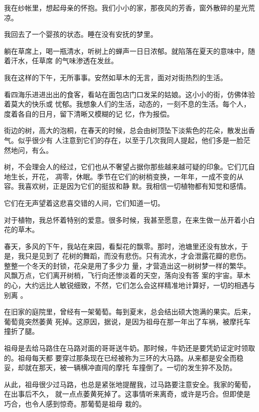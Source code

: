 \documentclass[12pt,a4paper]{article}
\begin{document}
		我在纱帐里，想起母亲的怀抱。我们小小的家，那夜风的芳香，窗外散碎的星光荒凉。

		我回去了一个婴孩的状态。睡在没有安抚的梦里。

	\endwriting



		躺在草席上，喝一瓶清水，听树上的蝉声一日日浓郁。就陷落在夏天的意味中，随着汗水，任草席
	的气味渗透在发丝。


		我在这样的下午，无所事事。安然如草木的无言，面对对街热烈的生活。

		看四海乐进进出出的食客，看站在面包店门口发呆的姑娘。这小小的街，仿佛体验着莫大的快乐或
	忧郁。我想象人们的生活，动态的，一刻不息的生活。每个人，度着各自的日月，留下清晰又模糊的记
	忆，作为报偿。

		街边的树，高大的泡桐，在春天的时候，总会由树顶坠下淡紫色的花朵，散发出香气。似乎很少有
	人注意到它们的存在，以至于几次我同人提起，他们多是一脸茫然地问，有么。


		树，不会理会人的经过，它们也从不奢望占据你那些越来越可疑的印象。它们兀自地生长，开花，
	凋零，休眠。季节在它们的树梢变换，一年年，一成不变的从容。我喜欢树，正是因为它们的挺拔和静
	默。我相信一切植物都有知觉和感情。

		它们在无声望着这悲喜交错的人间，它们知道一切。


		对于植物，我总怀着特别的爱意。很多时候，我甚至愿意，在来生做一丛开着小白花的草木。


		春天，多风的下午，我站在来园，看梨花的飘零。那时，池塘里还没有放水，于是，我只是见到了
	花树的舞蹈，而没有悲伤。只有流水，才会泄露花瓣的悲伤。整整一个冬天的封锁，花朵是用了多少力
	量，才营造出这一树树梦一样的繁华。风飘万点，它们离开树梢，飞行向还惨淡着的天空，落向没有答
	案的宇宙。草木的心，大约远比人敏锐细致，不然，它们怎么会这样精准地计算好，一切的相遇与别离
	。


		在旧家的庭院里，曾经有一架葡萄。每到夏末，总会结出硕大饱满的果实。后来，葡萄竟突然萎黄
	死掉。这原因，据说，是因为祖母在那一年出了车祸，被摩托车撞折了腿。


		祖母是去给马路住在马路对面的哥哥送牛奶。那时候，牛奶还是要凭奶证定时领取的。祖母每天都
	要穿过那条现在已经被称为三环的大马路。从来都是安全而稳妥，却就在那天，被一辆横冲直闯的摩托
	车撞倒了。一切的发生猝不及防。

		从此，祖母很少过马路，也总是紧张地提醒我，过马路要注意安全。我家的葡萄，在出事后不久，
	就一点点萎黄死掉了。这事情听来离奇，或许是巧合。但即使是巧合，也令人感到惊奇。那葡萄是祖母
	栽的。
\end{document}
